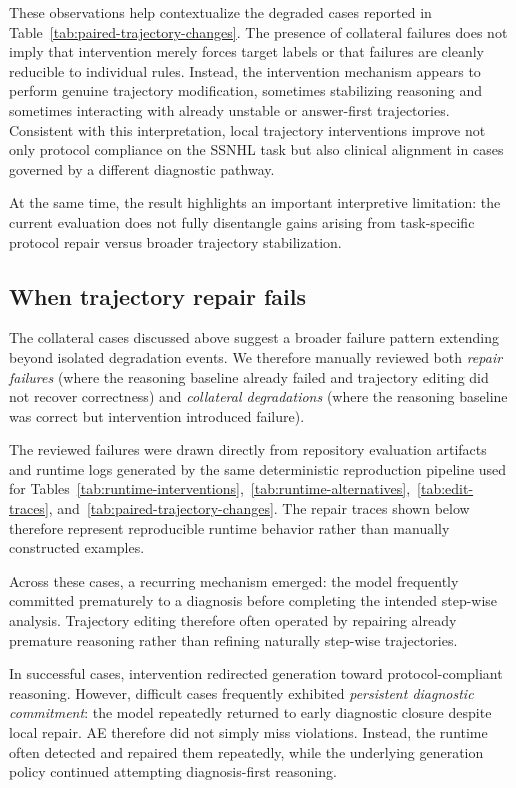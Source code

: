 \documentclass[twocolumn]{article}
\begin{document}
These observations help contextualize the degraded cases reported in
Table~\ref{tab:paired-trajectory-changes}. The presence of collateral failures
does not imply that intervention merely forces target labels or that failures
are cleanly reducible to individual rules. Instead, the intervention mechanism
appears to perform genuine trajectory modification, sometimes stabilizing
reasoning and sometimes interacting with already unstable or answer-first
trajectories. Consistent with this interpretation, local trajectory
interventions improve not only protocol compliance on the SSNHL task but also
clinical alignment in cases governed by a different diagnostic pathway.

At the same time, the result highlights an important interpretive limitation:
the current evaluation does not fully disentangle gains arising from
task-specific protocol repair versus broader trajectory stabilization.

\subsection{When trajectory repair fails}\label{sec:repair_failures}

The collateral cases discussed above suggest a broader failure pattern extending
beyond isolated degradation events. We therefore manually reviewed both
\emph{repair failures} (where the reasoning baseline already failed and
trajectory editing did not recover correctness) and \emph{collateral
degradations} (where the reasoning baseline was correct but intervention
introduced failure).

The reviewed failures were drawn directly from repository evaluation artifacts
and runtime logs generated by the same deterministic reproduction pipeline used
for
Tables~\ref{tab:runtime-interventions},~\ref{tab:runtime-alternatives},~\ref{tab:edit-traces},
and~\ref{tab:paired-trajectory-changes}. The repair traces shown below therefore
represent reproducible runtime behavior rather than manually constructed
examples.

Across these cases, a recurring mechanism emerged: the model frequently
committed prematurely to a diagnosis before completing the intended step-wise
analysis. Trajectory editing therefore often operated by repairing already
premature reasoning rather than refining naturally step-wise trajectories.

In successful cases, intervention redirected generation toward
protocol-compliant reasoning. However, difficult cases frequently exhibited
\emph{persistent diagnostic commitment}: the model repeatedly returned to early
diagnostic closure despite local repair. AE therefore did not simply miss
violations. Instead, the runtime often detected and repaired them repeatedly,
while the underlying generation policy continued attempting diagnosis-first
reasoning.
\end{document}
